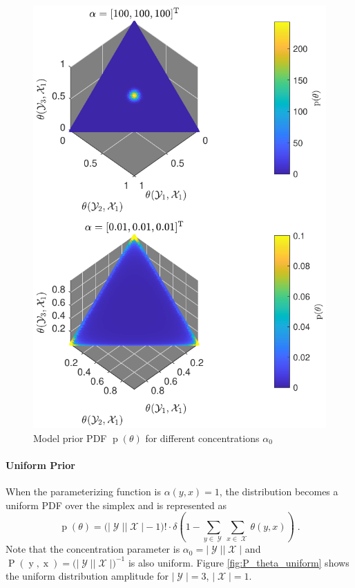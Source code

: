 \documentclass[12pt]{report}
\DeclareMathOperator{\xrm}{\mathrm{x}}
\DeclareMathOperator{\yrm}{\mathrm{y}}
\DeclareMathOperator{\Prm}{\mathrm{P}}
\DeclareMathOperator{\prm}{\mathrm{p}}
\DeclareMathOperator{\Xcal}{\mathcal{X}}
\DeclareMathOperator{\Ycal}{\mathcal{Y}}
\begin{document}
\begin{figure}
\centering
\includegraphics[scale=1.0]{P_theta.pdf}
\caption{Model prior PDF $\prm(\theta)$ for different concentrations $\alpha_0$}
\label{fig:P_theta}
\end{figure}





\paragraph{Uniform Prior}

When the parameterizing function is $\alpha(y,x) = 1$, the distribution becomes a uniform PDF over the simplex and is represented as
\begin{equation}
\prm(\theta) = \big( |\Ycal||\Xcal|-1 \big)! \cdot \delta \left( 1 - \sum_{y \in \Ycal} \sum_{x \in \Xcal}  \theta(y,x) \right) \;.
\end{equation}
Note that the concentration parameter is $\alpha_0 = |\Ycal||\Xcal|$ and $\Prm(\yrm,\xrm) = \big( |\Ycal||\Xcal| \big)^{-1}$ is also uniform. Figure \ref{fig:P_theta_uniform} shows the uniform distribution amplitude for $|\Ycal| = 3$, $|\Xcal| = 1$.
\end{document}
